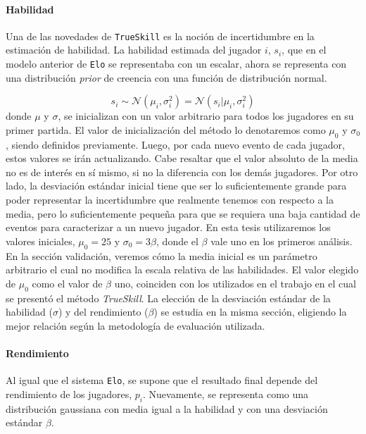 \documentclass[11pt,twoside,spanish]{report} %
\begin{document}
\paragraph{Habilidad}
Una de las novedades de \texttt{TrueSkill} es la noci\'on de incertidumbre en la estimaci\'on de habilidad.
La habilidad estimada del jugador $i$,  $s_i$, que en el modelo anterior de \texttt{Elo} se representaba con un escalar, ahora se representa con una distribuci\'on \textit{prior} de creencia con una funci\'on de distribuci\'on normal.

\begin{equation}
s_i \sim \mathcal{N}(\mu_i, \sigma_i^2) = \mathcal{N}(s_i|\mu_i, \sigma_i^2)
\end{equation}
donde $\mu$ y $\sigma$, se inicializan con un valor arbitrario para todos los jugadores en su primer partida.
El valor de inicializaci\'on del m\'etodo lo denotaremos como $\mu_0$ y $\sigma_0$, siendo definidos previamente.
Luego, por cada nuevo evento de cada jugador, estos valores se ir\'an actualizando.
Cabe resaltar que el valor absoluto de la media no es de inter\'es en s\'i mismo, si no la diferencia con los dem\'as jugadores.
Por otro lado, la desviaci\'on est\'andar inicial tiene que ser lo suficientemente grande para poder representar la incertidumbre que realmente tenemos con respecto a la media, pero lo suficientemente peque\~na para que se requiera una baja cantidad de eventos para caracterizar a un nuevo jugador.
En esta tesis utilizaremos los valores iniciales, $ \mu_0 = 25 $ y $ \sigma_0=3\beta$, donde el $\beta$ vale uno en los primeros an\'alisis.
En la secci\'on validaci\'on, veremos c\'omo la media inicial es un par\'ametro arbitrario el cual no modifica la escala relativa de las habilidades.
El valor elegido de $\mu_0$ como el valor de $\beta$ uno, coinciden con los utilizados en el trabajo en el cual se present\'o el m\'etodo \emph{TrueSkill}.
La elecci\'on de la desviaci\'on est\'andar de la habilidad ($\sigma$) y del rendimiento ($\beta$) se estudia en la misma secci\'on, eligiendo la mejor relaci\'on seg\'un la metodolog\'ia de evaluaci\'on utilizada.




\paragraph{Rendimiento}
Al igual que el sistema \texttt{Elo}, se supone que el resultado final depende del rendimiento de los jugadores, $p_i$.
Nuevamente, se representa como una distribuci\'on gaussiana con media igual a la habilidad y con una desviaci\'on est\'andar $\beta$.
\end{document}
